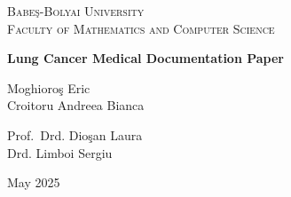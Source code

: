 \documentclass[a4paper,12pt]{article}
\begin{document}

\pagestyle{fancy}
\fancyhf{} %

\fancyhead[C]{\nouppercase{\leftmark}} %
\fancyfoot[C]{\thepage}                %

\renewcommand{\sectionmark}[1]{\markboth{#1}{}} %


\begin{titlepage}
    \centering

    {\scshape\large Babe\c{s}-Bolyai University\\Faculty of Mathematics and Computer Science\par}
    \vspace{4.0cm}

    {\huge\bfseries Lung Cancer Medical Documentation Paper\par}
    \vspace{2.0cm}

    {\Large Moghioro\c{s} Eric \\ Croitoru Andreea Bianca\par}
    \vspace{0.5cm}

    \vfill

    \noindent
    \begin{minipage}[t]{0.48\textwidth}
        \raggedright
        {\large Prof.\ Drd. Dio\c{s}an Laura \\ Drd. Limboi Sergiu}
    \end{minipage}%
    \hfill
    \begin{minipage}[t]{0.48\textwidth}
        \raggedleft
        {\large May 2025}
    \end{minipage}
\end{titlepage}

\end{document}
